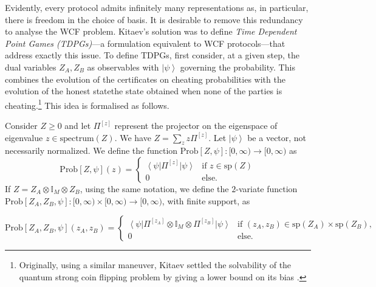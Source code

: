 \documentclass{theoretics}
\begin{document}
Evidently, every protocol admits infinitely many representations as, in particular, there is freedom in the choice of basis. It is desirable to remove this redundancy to analyse the WCF problem.
%
%
%
%
%
%
%
Kitaev's solution was to define \emph{Time Dependent Point Games (TDPGs)}---a formulation equivalent to WCF protocols---that address exactly this issue. To define TDPGs, %
first consider, at a given step, the dual variables $Z_{A},Z_{B}$ as observables with
$\left|\psi\right\rangle $ governing the probability. This combines
the evolution of the certificates on cheating probabilities with the
evolution of the honest state\textemdash the state obtained when none of the parties is cheating.\footnote{Originally, using a similar
  maneuver, Kitaev settled the solvability of the quantum strong coin flipping
  problem by giving a lower bound on its bias \cite{Kitaev03}.}  This idea is formalised as follows.  %
%
\begin{definition}[Prob]
  Consider $Z\ge0$ and let $\Pi^{[z]}$ represent the projector on
  the eigenspace of eigenvalue $z\in\text{spectrum}(Z)$. We have $Z=\sum_{z}z\Pi^{[z]}$.
  Let $\left|\psi\right\rangle $ be a
  vector, not necessarily normalized. We define the function  $\text{Prob}[Z,\psi]:[0,\infty)\to[0,\infty)$
  as
  \begin{displaymath}
    \text{Prob}[Z,\psi](z)=\begin{cases}
      \left\langle \psi\right|\Pi^{[z]}\left|\psi\right\rangle & \text{if }z\in\text{sp}(Z) \\
      0                                                        & \text{else}.
    \end{cases}
  \end{displaymath}
  If $Z=Z_{A}\otimes\mathbb{I}_{M}\otimes Z_{B}$, using the
  same notation, we define the $2$-variate function
  $\text{Prob}[Z_{A},Z_{B},\psi]:[0,\infty)\times[0,\infty)\to[0,\infty)$, with finite support,
  as \begin{small}
    \begin{displaymath}
      \text{Prob}[Z_{A},Z_{B},\psi](z_{A},z_{B})=\begin{cases}
        \left\langle \psi\right|\Pi^{[z_{A}]}\otimes\mathbb{I}_{M}\otimes\Pi^{[z_{B}]}\left|\psi\right\rangle & \text{if }(z_{A},z_{B})\in\text{sp}(Z_{A})\times\text{sp}(Z_{B}), \\
        0                                                                                                     & \text{else}.
      \end{cases}
    \end{displaymath}
  \end{small}

  \label{def:prob}
\end{definition}
\end{document}
